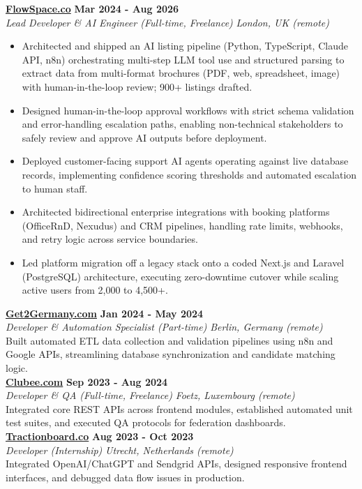 \documentclass[a4paper,10pt]{article}
\newcommand{\role}[4]{%
  \textbf{#1} \hfill \textbf{#2}\\[1pt]%
  \textit{#3} \hfill \textit{#4}\\[2pt]%
}
\begin{document}
\role{\href{https://flowspace.co}{FlowSpace.co}}{Mar 2024 - Aug 2026}{Lead Developer \& AI Engineer (Full-time, Freelance)}{London, UK (remote)}
\begin{itemize}
  \item Architected and shipped an AI listing pipeline (Python, TypeScript, Claude API, n8n) orchestrating multi-step LLM tool use and structured parsing to extract data from multi-format brochures (PDF, web, spreadsheet, image) with human-in-the-loop review; 900+ listings drafted.
  \item Designed human-in-the-loop approval workflows with strict schema validation and error-handling escalation paths, enabling non-technical stakeholders to safely review and approve AI outputs before deployment.
  \item Deployed customer-facing support AI agents operating against live database records, implementing confidence scoring thresholds and automated escalation to human staff.
  \item Architected bidirectional enterprise integrations with booking platforms (OfficeRnD, Nexudus) and CRM pipelines, handling rate limits, webhooks, and retry logic across service boundaries.
  \item Led platform migration off a legacy stack onto a coded Next.js and Laravel (PostgreSQL) architecture, executing zero-downtime cutover while scaling active users from 2,000 to 4,500+.
\end{itemize}

\role{\href{https://get2germany.com}{Get2Germany.com}}{Jan 2024 - May 2024}{Developer \& Automation Specialist (Part-time)}{Berlin, Germany (remote)}
Built automated ETL data collection and validation pipelines using n8n and Google APIs, streamlining database synchronization and candidate matching logic.\\[1pt]

\role{\href{https://clubee.com}{Clubee.com}}{Sep 2023 - Aug 2024}{Developer \& QA (Full-time, Freelance)}{Foetz, Luxembourg (remote)}
Integrated core REST APIs across frontend modules, established automated unit test suites, and executed QA protocols for federation dashboards.\\[1pt]

\role{\href{https://tractionboard.co}{Tractionboard.co}}{Aug 2023 - Oct 2023}{Developer (Internship)}{Utrecht, Netherlands (remote)}
Integrated OpenAI/ChatGPT and Sendgrid APIs, designed responsive frontend interfaces, and debugged data flow issues in production.
\end{document}
